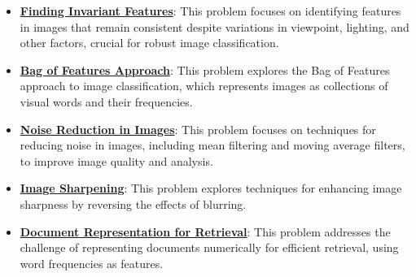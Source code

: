 \documentclass{article}%
\begin{document}
\begin{itemize}[leftmargin=*]
\item \href{https://purdue.brightspace.com/d2l/common/assets/pdfjs-d2l-dist/1.0.14-legacy/web/viewer.html?file=\%2Fcontent\%2Fenforced\%2F1095467-wl.202510.CS.24300.001\%2F07L2-Vision.pdf\%3Fou\%3D1095467\&lang=en-us\&container=d2l-fileviewer-rendered-pdf\&fullscreen=d2l-fileviewer-rendered-pdf-dialog\&height=667#page=11}{\textbf{Finding Invariant Features}}: This problem focuses on identifying features in images that remain consistent despite variations in viewpoint, lighting, and other factors, crucial for robust image classification.%
\item \href{https://purdue.brightspace.com/d2l/common/assets/pdfjs-d2l-dist/1.0.14-legacy/web/viewer.html?file=\%2Fcontent\%2Fenforced\%2F1095467-wl.202510.CS.24300.001\%2F07L2-Vision.pdf\%3Fou\%3D1095467\&lang=en-us\&container=d2l-fileviewer-rendered-pdf\&fullscreen=d2l-fileviewer-rendered-pdf-dialog\&height=667#page=12}{\textbf{Bag of Features Approach}}: This problem explores the Bag of Features approach to image classification, which represents images as collections of visual words and their frequencies.%
\item \href{https://purdue.brightspace.com/d2l/common/assets/pdfjs-d2l-dist/1.0.14-legacy/web/viewer.html?file=\%2Fcontent\%2Fenforced\%2F1095467-wl.202510.CS.24300.001\%2F07L2-Vision.pdf\%3Fou\%3D1095467\&lang=en-us\&container=d2l-fileviewer-rendered-pdf\&fullscreen=d2l-fileviewer-rendered-pdf-dialog\&height=667#page=35}{\textbf{Noise Reduction in Images}}: This problem focuses on techniques for reducing noise in images, including mean filtering and moving average filters, to improve image quality and analysis.%
\item \href{https://purdue.brightspace.com/d2l/common/assets/pdfjs-d2l-dist/1.0.14-legacy/web/viewer.html?file=\%2Fcontent\%2Fenforced\%2F1095467-wl.202510.CS.24300.001\%2F07L2-Vision.pdf\%3Fou\%3D1095467\&lang=en-us\&container=d2l-fileviewer-rendered-pdf\&fullscreen=d2l-fileviewer-rendered-pdf-dialog\&height=667#page=52}{\textbf{Image Sharpening}}: This problem explores techniques for enhancing image sharpness by reversing the effects of blurring.%
\item \href{https://purdue.brightspace.com/d2l/common/assets/pdfjs-d2l-dist/1.0.14-legacy/web/viewer.html?file=\%2Fcontent\%2Fenforced\%2F1095467-wl.202510.CS.24300.001\%2F07L2-Vision.pdf\%3Fou\%3D1095467\&lang=en-us\&container=d2l-fileviewer-rendered-pdf\&fullscreen=d2l-fileviewer-rendered-pdf-dialog\&height=667#page=20}{\textbf{Document Representation for Retrieval}}: This problem addresses the challenge of representing documents numerically for efficient retrieval, using word frequencies as features.%

\end{itemize}
\end{document}
